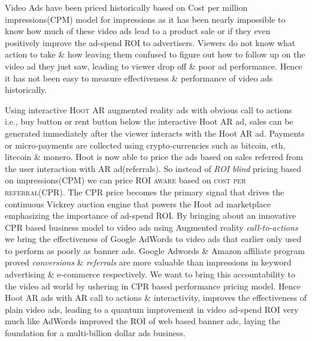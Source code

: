 Video Ads have been priced historically based on Cost per million impressions(CPM) model for impressions as it has been nearly impossible to know how much of these video ads lead to a product sale or if they even positively improve the ad-spend ROI to advertisers. Viewers do not know what action to take \& how leaving them confused to figure out how to follow up on the video ad they just saw, leading to viewer drop off \& poor ad performance. Hence it has not been easy to measure effectiveness \& performance of video ads historically.

Using interactive \textsc{Hoot AR} augmented reality ads with obvious call to actions i.e., buy button or rent button below the interactive Hoot AR ad, sales can be generated immediately after the viewer interacts with the Hoot AR ad. Payments or micro-payments are collected using crypto-currencies such as bitcoin, eth, litecoin \& monero. Hoot is now able to price the ads based on sales referred from the user interaction with AR ad(referrals). So instead of \emph{ROI blind} pricing based on impressions(CPM) we can price \textsc{ROI aware} based on \textsc{cost per referral(CPR)}. The CPR price becomes the primary signal that drives the continuous Vickrey auction engine that powers the Hoot ad marketplace emphasizing the importance of ad-spend ROI. By bringing about an innovative CPR based business model to video ads using Augmented reality \emph{call-to-actions} we bring the effectiveness of Google AdWords to video ads that earlier only used to perform as poorly as banner ads. Google Adwords \& Amazon affiliate program proved \emph{conversions} \& \emph{referrals} are more valuable than impressions in keyword advertising \& e-commerce respectively. We want to bring this accountability to the video ad world by ushering in CPR based performance pricing model. Hence Hoot AR ads with AR call to actions \& interactivity, improves the effectiveness of plain video ads, leading to a quantum improvement in video ad-spend ROI very much like AdWords improved the ROI of web based banner ads, laying the foundation for a multi-billion dollar ads business. 
